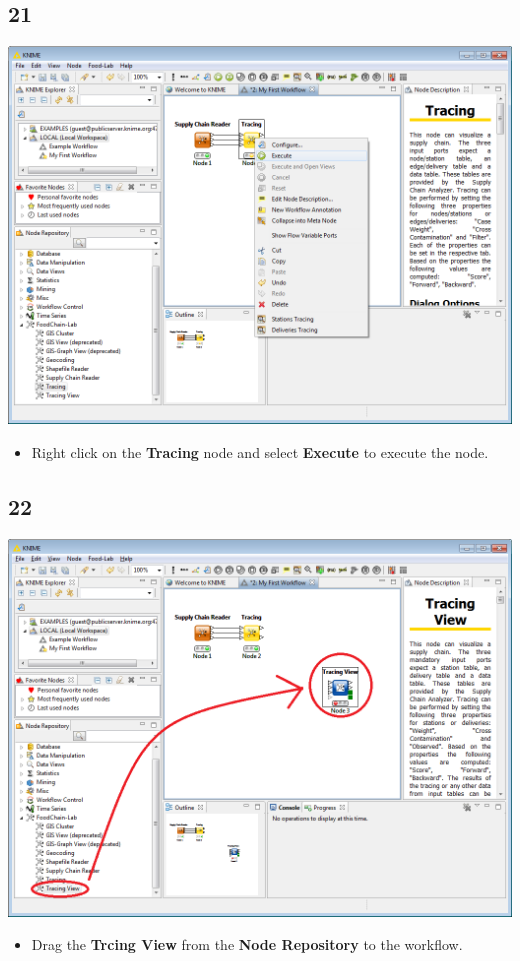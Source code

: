 \documentclass{beamer}
\begin{document}
\subsection{21}
\begin{frame}
	\begin{center}
  		\includegraphics[height=0.6\textheight]{21.png}
	\end{center}
	\begin{itemize}
		\item Right click on the \textbf{Tracing} node and select \textbf{Execute} to execute the node.
	\end{itemize}
\end{frame}

\subsection{22}
\begin{frame}
	\begin{center}
  		\includegraphics[height=0.6\textheight]{22.png}
	\end{center}
	\begin{itemize}
		\item Drag the \textbf{Trcing View} from the \textbf{Node Repository} to the workflow.
	\end{itemize}
\end{frame}
\end{document}
